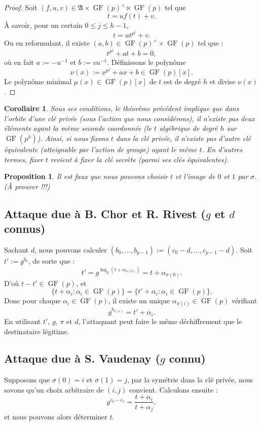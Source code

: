 \documentclass[a4paper, titlepage]{article}
\newtheorem{prop}[theo]{Proposition}
\newtheorem{coro}[theo]{Corollaire}
\theoremstyle{definition}
\theoremstyle{remark}
\def\gf{\operatorname{GF}}
\begin{document}
\begin{proof}
Soit $(f,u,v) \in {\mathfrak{A} \times \gf(p)^\times \ltimes \gf(p)}$ tel que $$t = uf(t) +v.$$
À savoir, pour un certain $0 \leqslant j \leqslant h-1$,
$$t = ut^{p^j} +v.$$
Ou en reformulant, il existe $(a,b) \in \gf(p)^{\times} \times \gf(p)$ tel que : $$t^{p^j} +at +b = 0,$$
où en fait $a := -u^{-1}$ et $b := vu^{-1}$.
Définissons le polynôme $$\nu(x) := x^{p^j} +ax +b \in \gf(p)[x].$$
Le polynôme minimal $\mu(x) \in \gf(p)[x]$ de $t$ est de degré $h$ et divise $\nu(x)$.
\end{proof}

\begin{coro}
Sous ses conditions, le théorème précédent implique que dans l'orbite d'une clé privée (sous l'action que nous considérons), il n'existe pas deux éléments ayant la même seconde coordonnée (le $t$ algébrique de degré $h$ sur $\gf(p^h)$). Ainsi, si nous fixons $t$ dans la clé privée, il n'existe pas d'autre clé équivalente (atteignable par l'action de groupe) ayant le même $t$. En d'autres termes, fixer $t$ revient à fixer la clé secrète (parmi ses clés équivalentes).
\end{coro}

\begin{prop}
Il est faux que nous pouvons choisir $t$ et l'image de $0$ et $1$ par $\sigma$. (À prouver !!!)
\end{prop}

\subsection{Attaque due à B. Chor et R. Rivest ($g$ et $d$ connus)}
Sachant $d$, nous pouvons calculer 
$( b_0, \dots, b_{p-1}) := (c_0 -d, \dots, c_{p-1}-d )$.
Soit $t' := g^{b_0}$, de sorte que :
$$t' = g^{\log_g(t+\alpha_{\sigma(0)})} = t + \alpha_{\sigma(0)}.$$
D'où $t-t' \in \gf(p)$, et 
$$\{t + \alpha_i : \alpha_i \in \gf(p)\} = \{t' + \alpha_i : \alpha_i \in \gf(p)\}.$$
Donc pour chaque $\alpha_i \in \gf(p)$, il existe un unique $\alpha_{\pi(i)} \in \gf(p)$ vérifiant 
$$g^{b_{\pi(i)}} =  t' +\alpha_{i}.$$
En utilisant $t'$, $g$, $\pi$ et $d$, l'attaquant peut faire le même déchiffrement que le destinataire légitime.

\subsection{Attaque due à S. Vaudenay ($g$ connu)}

Supposons que $\sigma(0) = i$ et $\sigma(1) = j$, par la symétrie dans la clé privée, nous savons qu'un choix arbitraire de $(i,j)$ convient. Calculons ensuite :
$$g^{c_0-c_1} = \frac{t+\alpha_i}{t+\alpha_j},$$
et nous pouvons alors déterminer $t$.
\end{document}

